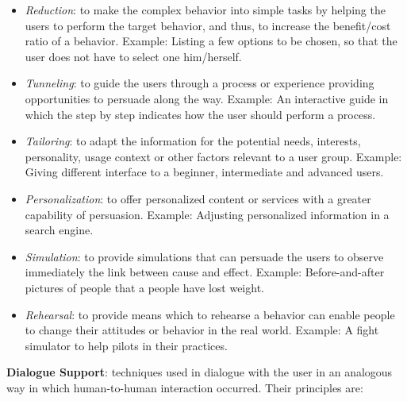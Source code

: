 \begin{itemize}
\item \emph{Reduction}: to make the complex behavior into simple tasks by helping the users to perform the target behavior, and thus, to increase the benefit/cost ratio of a behavior.
Example: Listing a few options to be chosen, so that the user does not have to select one him/herself.

\item \emph{Tunneling}: to guide the users through a process or experience providing opportunities to persuade along the way.
Example: An interactive guide in which the step by step indicates how the user should perform a process.

\item \emph{Tailoring}: to adapt the information for the potential needs, interests, personality, usage context or other factors relevant to a user group.
Example: Giving different interface to a beginner, intermediate and advanced users.

\item \emph{Personalization}: to offer personalized content or services with a greater capability of persuasion.
Example: Adjusting personalized information in a search engine.

\item \emph{Simulation}: to provide simulations that can persuade the users to observe immediately the link between cause and effect.
Example: Before-and-after pictures of people that a people have lost weight.

\item \emph{Rehearsal}: to provide means which to rehearse a behavior can enable people to change their attitudes or behavior in the real world.
Example: A fight simulator to help pilots in their practices.
\end{itemize}

\textbf{Dialogue Support}:
techniques used in dialogue with the user in an analogous way in which human-to-human interaction occurred.
Their principles are:

